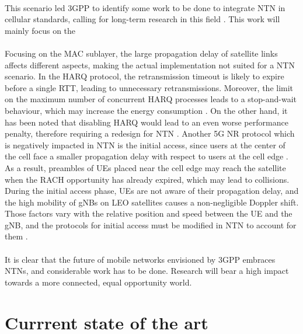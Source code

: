 \paragraph{}
This scenario led \ac{3GPP} to identify some work to be done to integrate \ac{NTN} in cellular standards, calling for long-term research in this field \cite{satellite-communication-mmwave-giordani}. This work will mainly focus on the 

\paragraph{} Focusing on the \ac{MAC} sublayer, the large propagation delay of satellite links affects different aspects, making the actual implementation not suited for a \ac{NTN} scenario. In the \ac{HARQ} protocol, the retransmission timeout is likely to expire before a single \ac{RTT}, leading to unnecessary retransmissions. Moreover, the limit on the maximum number of concurrent \ac{HARQ} processes leads to a stop-and-wait behaviour, which may increase the energy consumption \cite{3gpp-tr-38.811}. On the other hand, it has been noted that disabling \ac{HARQ} would lead to an even worse performance penalty, therefore requiring a redesign for \ac{NTN} \cite{5g-beyond-5g-ntn-trends-vanellicoralli}. Another 5G \ac{NR} protocol which is negatively impacted in \ac{NTN} is the initial access, since users at the center of the cell face a smaller propagation delay with respect to users at the cell edge \cite{5g-beyond-5g-ntn-trends-vanellicoralli} \cite{applying-nr-technologies-in-ntn-lee}. As a result, preambles of \ac{UE}s placed near the cell edge may reach the satellite when the \ac{RACH} opportunity has already expired, which may lead to collisions. During the initial access phase, \ac{UE}s are not aware of their propagation delay, and the high mobility of \ac{gNB}s on \ac{LEO} satellites causes a non-negligible Doppler shift. Those factors vary with the relative position and speed between the \ac{UE} and the \ac{gNB}, and the protocols for initial access must be modified in \ac{NTN} to account for them \cite{ntn-from-5g-6g-hassan}. 
\paragraph{}
It is clear that the future of mobile networks envisioned by \ac{3GPP} embraces \ac{NTN}s, and considerable work has to be done. Research will bear a high impact towards a more connected, equal opportunity world. 

\section{Currrent state of the art}
